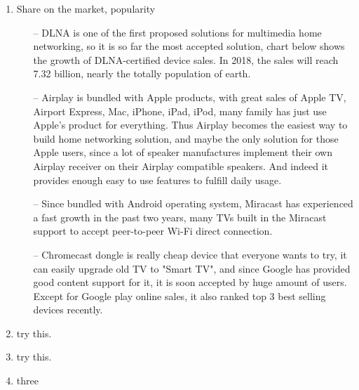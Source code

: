 \begin{enumerate}
\begin{itemize}
\end{itemize}
\item Share on the market, popularity
\begin{itemize}
\item[--]DLNA is one of the first proposed solutions for multimedia home networking, so it is so far the most accepted solution, chart below shows the growth of DLNA-certified device sales. In 2018, the sales will reach 7.32 billion, nearly the totally population of earth.
\item[--]Airplay is bundled with Apple products, with great sales of Apple TV, Airport Express, Mac, iPhone, iPad, iPod, many family has just use Apple's product for everything. Thus Airplay becomes the easiest way to build home networking solution, and maybe the only solution for those Apple users, since a lot of speaker manufactures implement their own Airplay receiver on their Airplay compatible speakers. And indeed it provides enough easy to use features to fulfill daily usage.
\item[--]Since bundled with Android operating system, Miracast has experienced a fast growth in the past two years, many TVs built in the Miracast support to accept peer-to-peer Wi-Fi direct connection.
\item[--]Chromecast dongle is really cheap device that everyone wants to try, it can easily upgrade old TV to "Smart TV", and since Google has provided good content support for it, it is soon accepted by huge amount of users. Except for Google play online sales, it also ranked top 3 best selling devices recently.
\end{itemize}
\item \label{a} try this.
\item \label{o} try this.
\item three
\end{enumerate}


